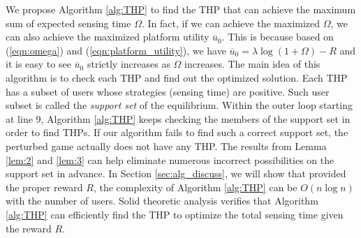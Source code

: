\documentclass{IEEEtran}
\begin{document}
We propose Algorithm \ref{alg:THP} to find the THP that can achieve the maximum sum of expected sensing time $\Omega$. 
{\color{black}
In fact, if we can achieve the maximized $\Omega$, we can also achieve the maximized platform utility $\overline{u}_0$. This is because based on (\ref{eqn:omega}) and (\ref{eqn:platform_utility}), we have $\overline{u}_0=\lambda \log{(1+\Omega)}-R$ and it is easy to see $\overline{u}_0$ strictly increases as $\Omega$ increases. 
}
The main idea of this algorithm is to check each THP and find out the optimized solution. Each THP has a subset of users whose strategies (sensing time) are positive. Such user subset is called the \emph{support set} of the equilibrium. Within the outer loop starting at line 9, Algorithm \ref{alg:THP} keeps checking the members of the support set in order to find THPs. If our algorithm fails to find such a correct support set, the perturbed game actually does not have any THP. The results from Lemma \ref{lem:2} and \ref{lem:3} can help eliminate numerous incorrect possibilities on the support set in advance. In Section \ref{sec:alg_discuss}, we will show that provided the proper reward $R$, the complexity of Algorithm \ref{alg:THP} can be $O(n\log n)$ with the number of users. Solid theoretic analysis verifies that Algorithm \ref{alg:THP} can efficiently find the THP to optimize the total sensing time given the reward $R$.
\end{document}
